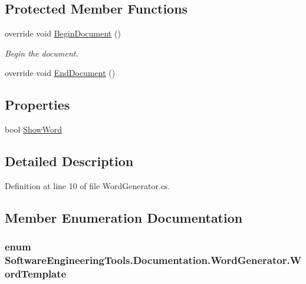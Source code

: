 \subsection*{Protected Member Functions}
\begin{DoxyCompactItemize}
\item 
override void \hyperlink{class_software_engineering_tools_1_1_documentation_1_1_word_generator_a8bde307f2f0e1951ef630820826d87d0}{Begin\+Document} ()
\begin{DoxyCompactList}\small\item\em Begin the document. \end{DoxyCompactList}\item 
override void \hyperlink{class_software_engineering_tools_1_1_documentation_1_1_word_generator_a0aadbc1dd71ab337f09e4e939915666e}{End\+Document} ()
\end{DoxyCompactItemize}
\subsection*{Properties}
\begin{DoxyCompactItemize}
\item 
bool \hyperlink{class_software_engineering_tools_1_1_documentation_1_1_word_generator_a56054cd420c6dc071f83b05bf9cb1dc3}{Show\+Word}
\end{DoxyCompactItemize}


\subsection{Detailed Description}


Definition at line 10 of file Word\+Generator.\+cs.



\subsection{Member Enumeration Documentation}
\hypertarget{class_software_engineering_tools_1_1_documentation_1_1_word_generator_a25625d01bb20e4edcaeede4fde7dcd0e}{
\subsubsection[{Word\+Template}]{\setlength{\rightskip}{0pt plus 5cm}enum {\bf Software\+Engineering\+Tools.\+Documentation.\+Word\+Generator.\+Word\+Template}}}\label{class_software_engineering_tools_1_1_documentation_1_1_word_generator_a25625d01bb20e4edcaeede4fde7dcd0e}


